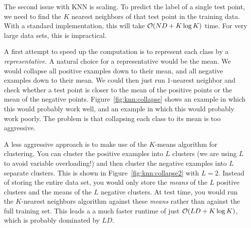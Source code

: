 The second issue with KNN is scaling.  To predict the label of a
single test point, we need to find the $K$ nearest neighbors of that
test point in the training data.  With a standard implementation, this
will take $\mathcal{O}(N D + K \log K)$ time.  For very
large data sets, this is impractical.


A first attempt to speed up the computation is to represent each class
by a \emph{representative.}  A natural choice for a representative
would be the mean.  We would collapse all positive examples down to
their mean, and all negative examples down to their mean.  We could
then just run $1$-nearest neighbor and check whether a test point is
closer to the mean of the positive points or the mean of the negative
points.  Figure~\ref{fig:knn:collapse} shows an example in which this
would probably work well, and an example in which this would probably
work poorly.  The problem is that collapsing each class to its mean is
too aggressive.


A less aggressive approach is to make use of the $K$-means algorithm
for clustering.  You can cluster the positive examples into $L$
clusters (we are using $L$ to avoid variable overloading!) and then
cluster the negative examples into $L$ separate clusters.  This is
shown in Figure~\ref{fig:knn:collapse2} with $L=2$.  Instead of storing the
entire data set, you would only store the \emph{means} of the $L$
positive clusters and the means of the $L$ negative clusters.  At test
time, you would run the $K$-nearest neighbors algorithm against these
\emph{means} rather than against the full training set.  This leads a
a much faster runtime of just $\mathcal{O}(L D + K \log K)$, which is probably
dominated by $LD$.



\begin{comment}
Similarities versus distances
Relationship to databases
Underfitting/overfitting by k
Weighted voting
From two classes to M classes
Decision boundaries for knn versus dts
Computational complexity
Reducing each class to one point: means
K-means clustering
\end{comment}

\begin{exercises}
\begin{Ex}
\TODO

\begin{solution}
\TODO
\end{solution}
\end{Ex}

\end{exercises}

